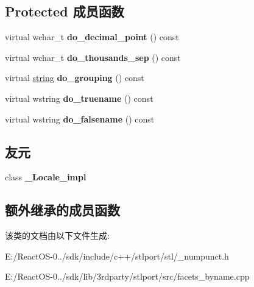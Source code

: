 \subsection*{Protected 成员函数}
\begin{DoxyCompactItemize}
\item 
\mbox{\label{classnumpunct__byname_3_01wchar__t_01_4_a88f42df62eb705025ed9432a5f06b21b}} 
virtual wchar\+\_\+t {\bfseries do\+\_\+decimal\+\_\+point} () const
\item 
\mbox{\label{classnumpunct__byname_3_01wchar__t_01_4_ab4300066ce3a752e1ef16ec81320ea1e}} 
virtual wchar\+\_\+t {\bfseries do\+\_\+thousands\+\_\+sep} () const
\item 
\mbox{\label{classnumpunct__byname_3_01wchar__t_01_4_a09fbf7e59cc5838550083af4899e0c73}} 
virtual \hyperlink{structstring}{string} {\bfseries do\+\_\+grouping} () const
\item 
\mbox{\label{classnumpunct__byname_3_01wchar__t_01_4_a91e467f59a28d1169be5dcaaa1dd2cd5}} 
virtual wstring {\bfseries do\+\_\+truename} () const
\item 
\mbox{\label{classnumpunct__byname_3_01wchar__t_01_4_a65fa1539a0fac3315cd60de39de6fc07}} 
virtual wstring {\bfseries do\+\_\+falsename} () const
\end{DoxyCompactItemize}
\subsection*{友元}
\begin{DoxyCompactItemize}
\item 
\mbox{\label{classnumpunct__byname_3_01wchar__t_01_4_ae9c09ac7cd16ad35f8fdb1587ac77eb8}} 
class {\bfseries \+\_\+\+Locale\+\_\+impl}
\end{DoxyCompactItemize}
\subsection*{额外继承的成员函数}


该类的文档由以下文件生成\+:\begin{DoxyCompactItemize}
\item 
E\+:/\+React\+O\+S-\/0../sdk/include/c++/stlport/stl/\+\_\+numpunct.\+h\item 
E\+:/\+React\+O\+S-\/0../sdk/lib/3rdparty/stlport/src/facets\+\_\+byname.\+cpp\end{DoxyCompactItemize}
